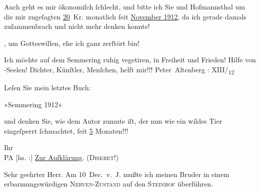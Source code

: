 \pstart
           Auch geht es mir ökonomiſch ſchlecht, und bitte ich Sie und Hofmannsthal um die mir {\pb}zugeſagten \uline{20} Kr. monatlich ſeit \uline{November 1912}, da ich
               gerade damals zuſammenbrach und nicht mehr denken konnte!\pend
           
\pstart
           , um Gotteswillen, ehe ich ganz zerſtört
               bin!\pend
           
\pstart
           Ich möchte auf dem Semmering ruhig vegetiren, in
               Freiheit und Frieden! Hilfe von -Seelen!
               Dichter, Künſtler, Menſchen, helft mir!!!\pend
           \pstart \spacefill\mbox{Peter Altenberg}\pend{}
\pstart
           \noindent{}{\pb}\label{T_L02120-1v}\label{T_L02120-1}: XIII/\textsubscript{12}{ }\label{K_L02120-2v}\label{K_L02120-2}\pend
           
\pstart
           Leſen Sie mein letztes Buch:\pend
           
\pstart
           \centering{}»Semmering 1912«\pend
           
\pstart
           und denken Sie, wie dem Autor zumute iſt, der nun wie ein wildes Tier eingeſperrt
                  ſchmachtet, ſeit \uline{5} Monaten!!!\pend
           
\pstart
           Ihr{\\}\spacefill\mbox{PA}\pend
           \vspace{1em}
\pstart
           {\pb}{[}hs. :{]} \uline{Zur Aufklärung}. \textsc{(Diskret!)}\pend
           
\pstart{}Sehr geehrter Herr.\pend\vspace{0.5em}
\pstart
           Am 10 Dec. v. J. mußte ich meinen Bruder in einem erbarmungswürdigen \textsc{Nerven-Zustand} auf den \textsc{Steinhof} überführen.\pend
           

